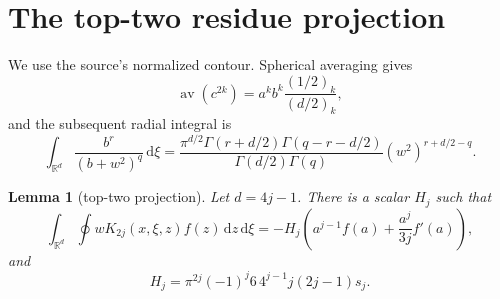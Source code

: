 \documentclass[11pt]{article}
\newtheorem{lemma}{Lemma}
\newcommand{\R}{\mathbb R}
\newcommand{\dd}{\,\mathrm d}
\begin{document}
\clearpage
\section{The top-two residue projection}

We use the source's normalized contour.  Spherical averaging gives
\[
 \operatorname{av}(c^{2k})
  =a^kb^k\frac{(1/2)_k}{(d/2)_k},
\]
and the subsequent radial integral is
\begin{equation}\label{eq:mellin}
 \int_{\R^d}\frac{b^r}{(b+w^2)^q}\dd\xi
 =\frac{\pi^{d/2}\Gamma(r+d/2)\Gamma(q-r-d/2)}
 {\Gamma(d/2)\Gamma(q)}(w^2)^{r+d/2-q}.
\end{equation}

\begin{lemma}[top-two projection]\label{lem:projection}
Let $d=4j-1$.  There is a scalar $H_j$ such that
\begin{equation}\label{eq:twores}
 \int_{\R^d}\oint wK_{2j}(x,\xi,z)f(z)\dd z\dd\xi
 =-H_j\left(a^{j-1}f(a)+\frac{a^j}{3j}f'(a)\right),
\end{equation}
and
\begin{equation}\label{eq:H}
 H_j=\pi^{2j}(-1)^j6\,4^{j-1}j(2j-1)s_j.
\end{equation}
\end{lemma}
\end{document}
